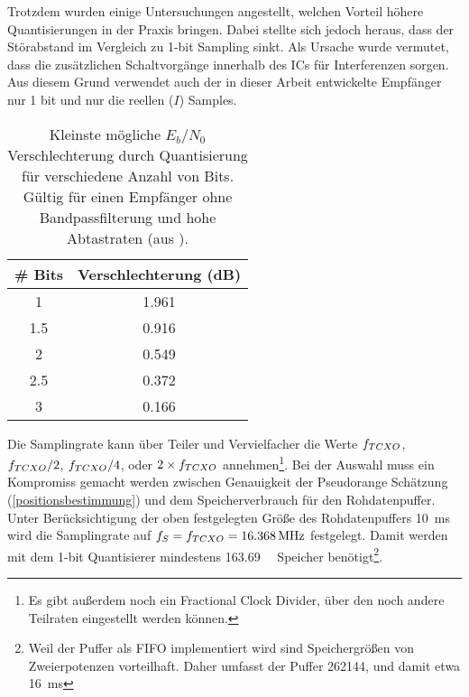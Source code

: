 Trotzdem wurden einige Untersuchungen angestellt, welchen Vorteil höhere Quantisierungen in der Praxis bringen. Dabei stellte sich jedoch heraus, dass der Störabstand im Vergleich zu 1-bit Sampling sinkt. Als Ursache wurde vermutet, dass die zusätzlichen Schaltvorgänge innerhalb des ICs für Interferenzen sorgen. Aus diesem Grund verwendet auch der in dieser Arbeit entwickelte Empfänger nur 1 bit und nur die reellen ($I$) Samples.


\begin{table}[htbp]
    \ttabbox
    {
        \caption[$E_b/N_0$ Verschlechterung durch Quantisierung]{Kleinste mögliche $E_b/N_0$ Verschlechterung durch Quantisierung für verschiedene Anzahl von Bits. Gültig für einen Empfänger ohne Bandpassfilterung und hohe Abtastraten (aus \cite{hegarty2011analytical}).}
        \label{TabDegradQuant}
    }
    {
    \begin{tabular}{c c}
        \toprule
        \# Bits             &  Verschlechterung (dB)\\
        \midrule
        \num{1}         & \num{1,961} \\
        \num{1.5}    & \num{0.916} \\
        \num{2}           & \num{0.549} \\
        \num{2.5}    & \num{0.372} \\
        \num{3}           & \num{0.166} \\
        \bottomrule
    \end{tabular}
    }
\end{table}

Die Samplingrate kann über Teiler und Vervielfacher die Werte $f_{TCXO}$, $f_{TCXO}/2$, $f_{TCXO}/4$, oder $2\times f_{TCXO}$ annehmen\footnote{Es gibt außerdem noch ein Fractional Clock Divider, über den noch andere Teilraten eingestellt werden können.}. Bei der Auswahl muss ein Kompromiss gemacht werden zwischen Genauigkeit der Pseudorange Schätzung (\ref{positionsbestimmung}) und dem Speicherverbrauch für den Rohdatenpuffer. Unter Berücksichtigung der oben festgelegten Größe des Rohdatenpuffers \SI{10}{\ms} wird die Samplingrate auf  $f_S=\gpsftcxo=\SI{16.368}{\MHz}$ festgelegt. Damit werden mit dem 1-bit Quantisierer mindestens \SI{163.69}{\kilo\bit} Speicher benötigt\footnote{Weil der Puffer als FIFO implementiert wird sind Speichergrößen von Zweierpotenzen vorteilhaft. Daher umfasst der Puffer \SI{262144}{\bit}, und damit etwa \SI{16}{\ms}}.

